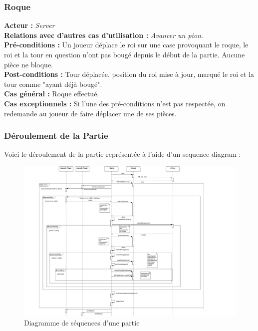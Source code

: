 \documentclass[10pt, a4paper]{article}
\begin{document}
\subsubsection{Roque}
\textbf{Acteur :} \textit{Server} \\
\textbf{Relations avec d'autres cas d'utilisation :} {\itshape Avancer un pion}. \\
\textbf{Pré-conditions :} Un joueur déplace le roi sur une case provoquant le roque, le roi et la tour en question n'ont pas bougé depuis le début de la partie. Aucune pièce ne bloque. \\
\textbf{Post-conditions :} Tour déplacée, position du roi mise à jour, marqué le roi et la tour comme "ayant déjà bougé". \\
\textbf{Cas général :} Roque effectué. \\
\textbf{Cas exceptionnels :} Si l'une des pré-conditions n'est pas respectée, on redemande au joueur de faire déplacer une de ses pièces. \\

\subsubsection{Déroulement de la Partie}
Voici le déroulement de la partie représentée à l'aide d'un sequence diagram : \\

\begin{figure}[ht]
\includegraphics[scale=0.53]{SequenceDiagramClassicChessTurn.png}
\caption{Diagramme de séquences d'une partie}
\label{SD_classicgame}
\end{figure}
\clearpage
\end{document}

